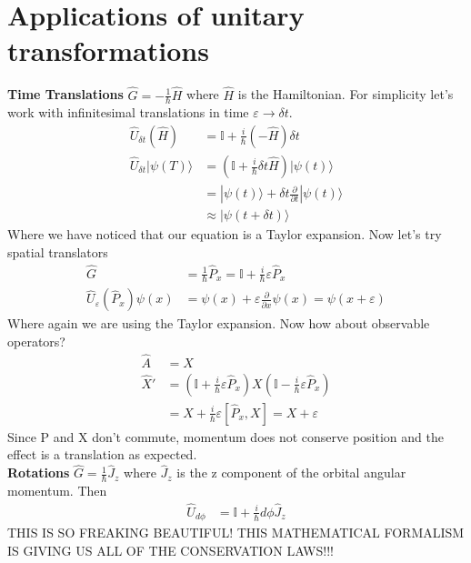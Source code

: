 \documentclass[a4paper, 11pt]{article}
\newcommand{\ket}[1]{|#1\rangle}
\begin{document}
\section*{Applications of unitary transformations}
	\noindent\textbf{Time Translations} $\hat{G} = -\frac{1}{\hbar}\hat{H}$ where $\hat{H}$ is the Hamiltonian. For simplicity let's work with infinitesimal translations in time $\varepsilon\to \delta t$. 
		\begin{align*}
			\hat{U}_{\delta t}(\hat{H}) &= \mathbb{I} + \frac{i}{\hbar}(-\hat{H})\delta t \\
			\hat{U}_{\delta t}\ket{\psi(T)} &= (\mathbb{I}+\frac{i}{\hbar}\delta t\hat{H})\ket{\psi(t)} \\ 
			&= \ket{\psi(t)}+\delta t \frac{\partial}{\partial t}\ket{\psi(t)} \\ 
			&\approx \ket{\psi(t+\delta t)} 
		\end{align*}
	Where we have noticed that our equation is a Taylor expansion. Now let's try spatial translators 
		\begin{align*}
			\hat{G} &= \frac{1}{\hbar}\hat{P}_x = \mathbb{I}+\frac{i}{\hbar}\varepsilon\hat{P}_x \\ 
			\hat{U}_{\varepsilon}(\hat{P}_x)\psi(x) &= \psi(x) + \varepsilon\frac{\partial}{\partial x}\psi(x) = \psi(x+\varepsilon) 
		\end{align*}
	Where again we are using the Taylor expansion. Now how about observable operators? 
		\begin{align*}
			\hat{A} &= X  \\ 
			\hat{X}' &= (\mathbb{I}+\frac{i}{\hbar}\varepsilon\hat{P}_x)X(\mathbb{I}-\frac{i}{\hbar}\varepsilon\hat{P}_x) \\ 
			&= X + \frac{i}{\hbar}\varepsilon[\hat{P}_x, X] = X + \varepsilon
		\end{align*}
	Since P and X don't commute, momentum does not conserve position and the effect is a translation as expected. \\
	
	\noindent\textbf{Rotations} $\hat{G}= \frac{1}{\hbar}\hat{J}_z$ where $\hat{J}_z$ is the z component of the orbital angular momentum. Then 
		\begin{align*}
			\hat{U}_{d\phi} &= \mathbb{I} + \frac{i}{\hbar}d\phi\hat{J}_z 
		\end{align*} 
	THIS IS SO FREAKING BEAUTIFUL! THIS MATHEMATICAL FORMALISM IS GIVING US ALL OF THE CONSERVATION LAWS!!!
	
\end{document}
